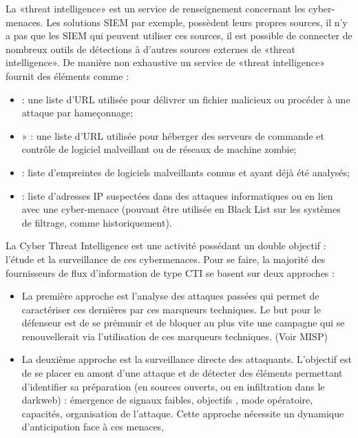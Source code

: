 La «threat intelligence» est un service de renseignement concernant les cyber-menaces. Les solutions SIEM par exemple, possèdent leurs propres sources, il n'y a pas que les SIEM qui peuvent utiliser ces sources,  il est possible de connecter de nombreux outils de détections à d’autres sources externes de «threat intelligence». De manière non exhaustive un service de «threat intelligence»  fournit des éléments comme :
\begin{itemize}
  \item {} : une liste d’URL utilisée pour  délivrer un fichier malicieux ou procéder à une attaque par hameçonnage;
  \item 	{}» : une liste d’URL utilisée pour héberger des serveurs de commande et contrôle de logiciel malveillant ou de réseaux de machine zombie;
  \item {} : liste d’empreintes de logiciels malveillants connus et ayant déjà été analysés;
  \item {} : liste d’adresses IP suspectées dans des attaques informatiques ou en lien avec une cyber-menace (pouvant être utilisée en Black List sur les systèmes de filtrage, comme historiquement).
\end{itemize}


La Cyber Threat Intelligence est une activité possédant un double objectif  :  l’étude et la surveillance de ces cybermenaces. Pour se faire, la majorité des fournisseurs  de flux d’information de type CTI se basent sur deux approches :


\begin{itemize}
  \item La première approche est l’analyse des attaques passées qui permet de caractériser ces dernières par ces marqueurs techniques. Le but pour le défenseur est de se prémunir et de bloquer au plus vite une campagne qui se renouvellerait via l’utilisation de ces marqueurs techniques. (Voir MISP)
  \item La deuxième approche est la surveillance directe des attaquants. L’objectif est de se placer en amont d’une attaque et de détecter des éléments permettant d’identifier sa préparation (en sources ouverts, ou en infiltration dans le darkweb) : émergence de signaux faibles, objectifs , mode opératoire,  capacités, organisation de l'attaque. Cette approche nécessite un dynamique d’anticipation face à ces menaces,
\end{itemize}


